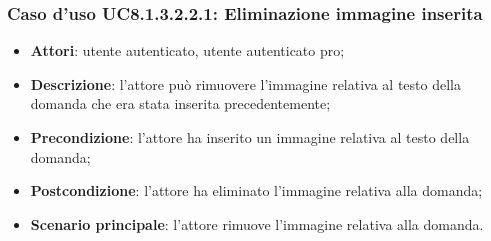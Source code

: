 \subsubsection{Caso d'uso UC8.1.3.2.2.1: Eliminazione immagine inserita}
		\begin{itemize}
		\item
			\textbf{Attori}: utente autenticato, utente autenticato pro;
		\item		
			\textbf{Descrizione}: l'attore può rimuovere l'immagine relativa al testo della domanda che era stata inserita precedentemente;
		\item
			\textbf{Precondizione}: l'attore ha inserito un immagine relativa al testo della domanda;
		\item
			\textbf{Postcondizione}: l'attore ha eliminato l'immagine relativa alla domanda;
		\item
			\textbf{Scenario principale}: l'attore rimuove l'immagine relativa alla domanda. 
		\end{itemize}
	
